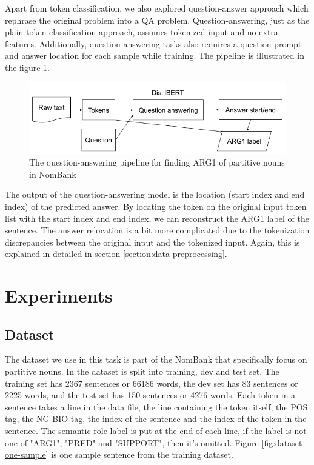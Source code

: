 \documentclass[11pt]{article}
\begin{document}
Apart from token classification, we also explored question-answer approach which rephrase the original problem into a QA problem. Question-answering, just as the plain token classification approach, assumes tokenized input and no extra features. Additionally, question-answering tasks also requires a question prompt and answer location for each sample while training. The pipeline is illustrated in the figure \ref{fig:qa-arg1-pipeline}.

\begin{figure}[h]
  \centering
  \includegraphics[width=\linewidth]{assets/qa-arg1-pipeline.png}
  \caption{The question-answering pipeline for finding ARG1 of partitive nouns in NomBank}
  \label{fig:qa-arg1-pipeline}
\end{figure}

The output of the question-answering model is the location (start index and end index) of the predicted answer. By locating the token on the original input token list with the start index and end index, we can reconstruct the ARG1 label of the sentence. The answer relocation is a bit more complicated due to the tokenization discrepancies between the original input and the tokenized input. Again, this is explained in detailed in section \ref{section:data-preprocessing}.

\section{Experiments}

\subsection{Dataset}

The dataset we use in this task is part of the NomBank that specifically focus on partitive nouns. In the dataset is split into training, dev and test set. The training set has 2367 sentences or 66186 words, the dev set has 83 sentences or 2225 words, and the test set has 150 sentences or 4276 words. Each token in a sentence takes a line in the data file, the line containing the token itself, the POS tag, the NG-BIO tag, the index of the sentence and the index of the token in the sentence. The semantic role label is put at the end of each line, if the label is not one of "ARG1", "PRED" and "SUPPORT", then it's omitted. Figure \ref{fig:dataset-one-sample} is one sample sentence from the training dataset.
\end{document}
